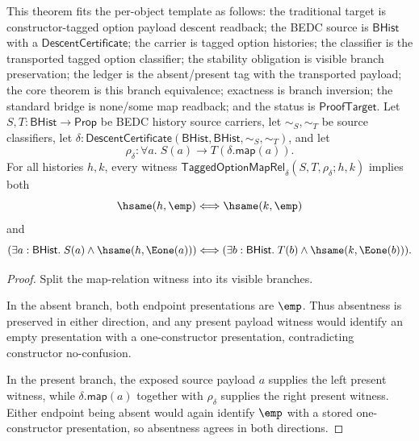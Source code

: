 \begin{theorem}
\label{thm:tagged-option-maprel-visible-branch-equivalence}
This theorem fits the per-object template as follows: the traditional target is
constructor-tagged option payload descent readback; the BEDC source is
$\mathsf{BHist}$ with a
$\mathsf{DescentCertificate}$; the carrier is tagged option histories; the
classifier is the transported tagged option classifier; the stability obligation
is visible branch preservation; the ledger is the absent/present tag with the
transported payload; the core theorem is this branch equivalence; exactness is
branch inversion; the standard bridge is none/some map readback; and the status
is $\mathsf{ProofTarget}$. Let $S,T:\mathsf{BHist}\to\mathsf{Prop}$ be BEDC
history source carriers, let $\sim_S,\sim_T$ be source classifiers, let
$\delta:\mathsf{DescentCertificate}(\mathsf{BHist},\mathsf{BHist},\sim_S,\sim_T)$,
and let
$$
\rho_{\delta}:\forall a.\;S(a)\to T(\delta.\mathsf{map}(a)).
$$
For all histories $h,k$, every witness
$\mathsf{TaggedOptionMapRel}_{\delta}(S,T,\rho_{\delta};h,k)$ implies both
$$
\hsame(h,\emp)\Longleftrightarrow\hsame(k,\emp)
$$
and
$$
(\exists a:\mathsf{BHist}.\;S(a)\land\hsame(h,\Eone(a)))
\Longleftrightarrow
(\exists b:\mathsf{BHist}.\;T(b)\land\hsame(k,\Eone(b))).
$$
\end{theorem}
\begin{proof}
Split the map-relation witness into its visible branches.

In the absent branch, both endpoint presentations are $\emp$. Thus absentness is
preserved in either direction, and any present payload witness would identify an
empty presentation with a one-constructor presentation, contradicting
constructor no-confusion.

In the present branch, the exposed source payload $a$ supplies the left present
witness, while $\delta.\mathsf{map}(a)$ together with $\rho_{\delta}$ supplies
the right present witness. Either endpoint being absent would again identify
$\emp$ with a stored one-constructor presentation, so absentness agrees in both
directions.
\end{proof}

